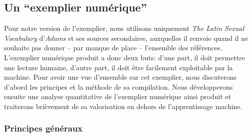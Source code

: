 % 

\subsection{Un \enquote{exemplier numérique}}

Pour notre version de l'exemplier, nous utilisons uniquement \textit{The Latin Sexual Vocabulary} d'\textit{Adams} et ses sources secondaires, auxquelles il renvoie quand il ne souhaite pas donner -- par manque de place -- l'ensemble des références. L'exemplier numérique produit a donc deux buts: d'une part, il doit permettre une lecture humaine, d'autre part, il doit être facilement exploitable par la machine. Pour avoir une vue d'ensemble sur cet exemplier, nous discuterons d'abord les principes et la méthode de sa compilation. Nous développerons ensuite une analyse quantitative de l'exemplier numérique ainsi produit et traiterons brièvement de sa valorisation en dehors de l'apprentissage machine.

\subsubsection{Principes généraux}



